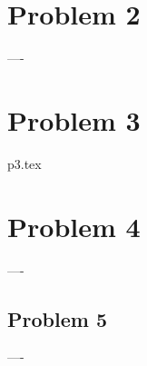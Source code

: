 \documentclass[a4paper]{article}
\begin{document}
    \section{Problem 2}\label{subsec:problem-2}
    ----

    \section{Problem 3}\label{subsec:problem-3}
    {p3.tex}

    \section{Problem 4}\label{subsec:problem-4}
    ----

    \subsection{Problem 5}
    ----
\end{document}
